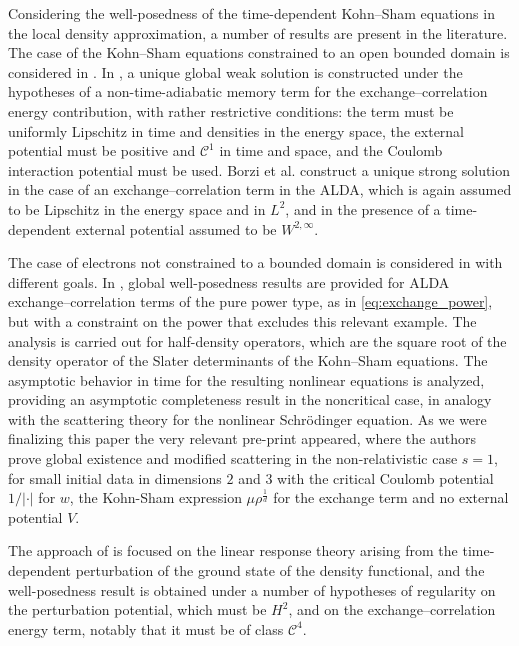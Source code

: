 \documentclass[12pt,a4paper]{amsart}
\numberwithin{equation}{section}
\begin{document}
	Considering the well-posedness of the time-dependent Kohn–Sham equations in the local density approximation, a number of results are present in the literature. The case of the Kohn–Sham equations constrained to an open bounded domain is considered in \cite{JEROME2015995,BorzietAl2017}. In \cite{JEROME2015995}, a unique global weak solution is constructed under the hypotheses of a non-time-adiabatic memory term for the exchange–correlation energy contribution, with rather restrictive conditions: the term must be uniformly Lipschitz in time and densities in the energy space, the external potential must be positive and $\mathscr{C}^1$ in time and space, and the Coulomb interaction potential must be used. Borzi et al. \cite{BorzietAl2017} construct a unique strong solution in the case of an exchange–correlation term in the ALDA, which is again assumed to be Lipschitz in the energy space and in $L^2$, and in the presence of a time-dependent external potential assumed to be $W^{2,\infty}$.
	
	The case of electrons not constrained to a bounded domain is considered in \cite{pusateri2021long,dupuy2025linear} with different goals. In \cite{pusateri2021long}, global well-posedness results are provided for ALDA exchange–correlation terms of the pure power type, as in \eqref{eq:exchange_power}, but with a constraint on the power that excludes this relevant example. The analysis is carried out for half-density operators, which are the square root of the density operator of the Slater determinants of the Kohn–Sham equations. The asymptotic behavior in time for the resulting nonlinear equations is analyzed, providing an asymptotic completeness result in the noncritical case, in analogy with the scattering theory for the nonlinear Schrödinger equation. As we were finalizing this paper the very relevant pre-print \cite{kawamoto2026} appeared, where the authors prove global existence and modified scattering in the non-relativistic case $s=1$, for small initial data in dimensions $2$ and $3$ with the critical Coulomb potential $1/|\cdot|$ for $w$, the Kohn-Sham expression $ \mu \rho^{\frac{1}{d}} $ for the exchange term and no external potential $V$. %
	
	The approach of \cite{dupuy2025linear} is focused on the linear response theory arising from the time-dependent perturbation of the ground state of the density functional, and the well-posedness result is obtained under a number of hypotheses of regularity on the perturbation potential, which must be $H^2$, and on the exchange–correlation energy term, notably that it must be of class $\mathscr{C}^4$.
	
\end{document}
